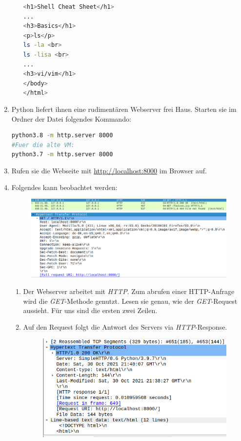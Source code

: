 \documentclass[paper=a4,fontsize=11pt]{scrartcl}%
\numberwithin{equation}{section}
\begin{document}
\begin{enumerate}
\begin{enumerate}
\begin{lstlisting}[style=Bash, language=Bash]
<h1>Shell Cheat Sheet</h1>
...
<h3>Basics</h1>
<p>ls</p>
ls -la <br>
ls -lisa <br>
...
<h3>vi/vim</h1>
</body>
</html> 
		\end{lstlisting}
	\end{enumerate}
	\item Python liefert ihnen eine rudimentären Webserver frei Haus. Starten sie im Ordner der  Datei folgendes Kommando:
		\begin{lstlisting}[style=Bash, language=Bash]
python3.8 -m http.server 8000
#Fuer die alte VM:
python3.7 -m http.server 8000
		\end{lstlisting}
	\item Rufen sie die Webseite mit \url{http://localhost:8000} im Browser auf.
	\item Folgendes kann beobachtet werden:
	\begin{figure}[H]
	\center
	\includegraphics[scale=0.3]{get1}\\
	\includegraphics[scale=0.4]{get2}
	\end{figure}
	\begin{enumerate}
		\item Der Webserver arbeitet mit \emph{HTTP}. Zum abrufen einer HTTP-Anfrage wird die \emph{GET}-Methode genutzt. Lesen sie genau, wie der \emph{GET}-Request aussieht. Für uns sind die ersten zwei Zeilen.
		\item Auf den Request folgt die Antwort des Servers via \emph{HTTP}-Response.
		\begin{figure}[H]
		\center
		\includegraphics[scale=0.5]{get3}

\end{figure}
\end{enumerate}
\end{enumerate}
\end{document}
